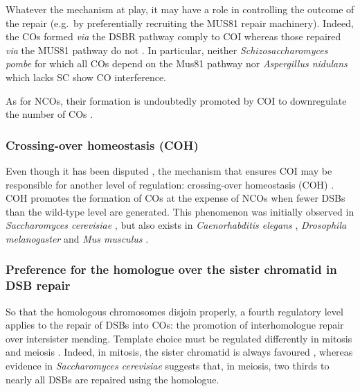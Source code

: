 Whatever the mechanism at play, it may have a role in controlling the outcome of the repair
(e.g.\ by preferentially recruiting the MUS81 repair machinery).
Indeed, the COs formed \textit{via} the DSBR pathway comply to COI whereas those repaired \textit{via} the MUS81 pathway do not \citep{santos2003mus81,kohl2013meiotic}.
In particular, neither \textit{Schizosaccharomyces pombe} for which all COs depend on the Mus81 pathway \citep{munz1994analysis,hollingsworth2004mus81,cromie2006single} nor \textit{Aspergillus nidulans} which lacks SC \citep[reviewed in \citealp{shaw1998meiosis} and \citealp{egel1995synaptonemal}]{strickland1958analysis} show CO interference.

As for NCOs, their formation is undoubtedly promoted by COI to downregulate the number of COs \citep{rockmill2003sgs1,youds2010rtel1,crismani2012fancm,seguela-arnaud2015multiple}.


\subsubsection{Crossing-over homeostasis (COH)}
Even though it has been disputed \citep{shinohara2008crossover}, the mechanism that ensures COI may be responsible for another level of regulation: crossing-over homeostasis (COH) \citep[reviewed in \citealp{youds2011choice}]{joshi2009pch2,zanders2009pch2delta}.
COH promotes the formation of COs at the expense of NCOs when fewer DSBs than the wild-type level are generated.
This phenomenon was initially observed in \textit{Saccharomyces cerevisiae} \citep{martini2006crossover,chen2008global}, but also exists in \textit{Caenorhabditis elegans} \citep{yokoo2012cosa1,globus2012joy}, \textit{Drosophila melanogaster} \citep{mehrotra2006temporal} and \textit{Mus musculus} \citep{cole2012homeostatic}.



\subsubsection{Preference for the homologue over the sister chromatid in DSB repair}
So that the homologous chromosomes disjoin properly, a fourth regulatory level applies to the repair of DSBs into COs: the promotion of interhomologue repair over intersister mending.
Template choice must be regulated differently in mitosis and meiosis \citep{andersen2010meiotic}.
Indeed, in mitosis, the sister chromatid is always favoured \citep{kadyk1992sister,bzymek2010double}, whereas evidence in \textit{Saccharomyces cerevisiae} suggests that, in meiosis, two thirds \citep{goldfarb2010frequent} to nearly all \citep{pan2011hierarchical} DSBs are repaired using the homologue.\\


